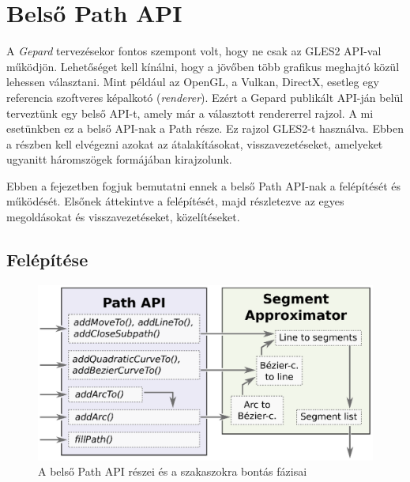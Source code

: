 \documentclass[12pt]{report}
\theoremstyle{definition}
\newcommand{\inenglish}[1]{\textsl{#1}}
\begin{document}
    \chapter{Belső Path API}

  A \emph{Gepard} tervezésekor fontos szempont volt, hogy ne csak az
GLES2 API-val működjön. Lehetőséget kell kínálni, hogy a jövőben
több grafikus meghajtó közül lehessen választani. Mint például
az OpenGL, a Vulkan, DirectX, esetleg egy referencia szoftveres
képalkotó (\inenglish{renderer}). Ezért a Gepard publikált API-ján
belül terveztünk egy belső API-t, amely már a választott
rendererrel rajzol. A mi esetünkben ez a belső API-nak a Path
része. Ez rajzol GLES2-t használva. Ebben a részben kell elvégezni
azokat az átalakításokat, visszavezetéseket, amelyeket ugyanitt
háromszögek formájában kirajzolunk.

  Ebben a fejezetben fogjuk bemutatni ennek a belső Path API-nak a
felépítését és működését. Elsőnek áttekintve a
felépítését, majd részletezve az egyes megoldásokat és
visszavezetéseket, közelítéseket.

    \section[Felépítése]{Felépítése}
    \label{Felépítése}

    \begin{figure}
    \begin{center}
      \includegraphics[scale=0.6]{dataflow_path_api.eps}
    \end{center}
      \caption{\label{dataflow-path-API-diagram} A belső Path API
      részei és a szakaszokra bontás fázisai}
    \end{figure}
\end{document}
